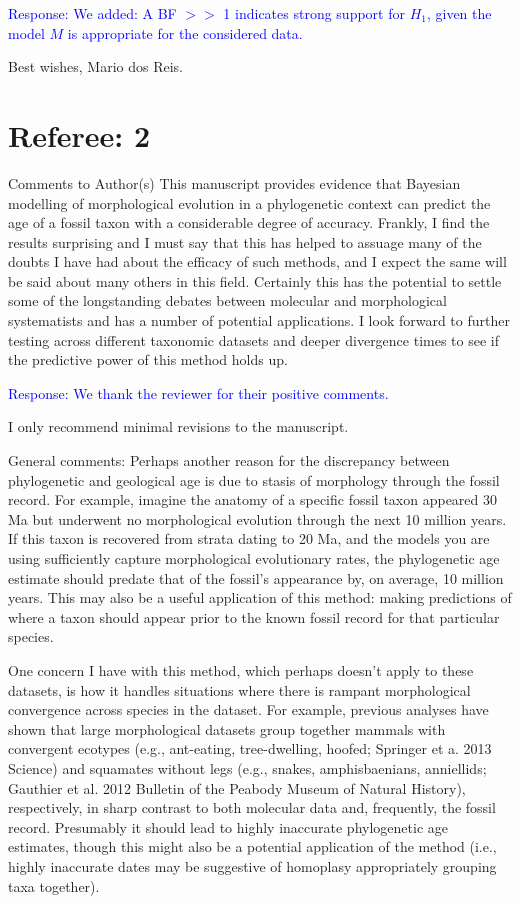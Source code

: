\documentclass[11pt]{article}
\newcommand{\response}[1]{\medskip{}\textcolor{blue}{{Response: #1}}\medskip{}}
\begin{document}
\response{We added: A BF $>>$ 1 indicates strong support for $H_1$, given the model $M$ is appropriate for the considered data.}

Best wishes,
Mario dos Reis.

\section*{Referee: 2}

Comments to Author(s)
This manuscript provides evidence that Bayesian modelling of morphological evolution in a phylogenetic context can predict the age of a fossil taxon with a considerable degree of accuracy. Frankly, I find the results surprising and I must say that this has helped to assuage many of the doubts I have had about the efficacy of such methods, and I expect the same will be said about many others in this field. Certainly this has the potential to settle some of the longstanding debates between molecular and morphological systematists and has a number of potential applications. I look forward to further testing across different taxonomic datasets and deeper divergence times to see if the predictive power of this method holds up. 

\response{We thank the reviewer for their positive comments.}

I only recommend minimal revisions to the manuscript.

General comments:
Perhaps another reason for the discrepancy between phylogenetic and geological age is due to stasis of morphology through the fossil record. For example, imagine the anatomy of a specific fossil taxon appeared 30 Ma but underwent no morphological evolution through the next 10 million years. If this taxon is recovered from strata dating to 20 Ma, and the models you are using sufficiently capture morphological evolutionary rates, the phylogenetic age estimate should predate that of the fossil's appearance by, on average, 10 million years. This may also be a useful application of this method: making predictions of where a taxon should appear prior to the known fossil record for that particular species.

One concern I have with this method, which perhaps doesn't apply to these datasets, is how it handles situations where there is rampant morphological convergence across species in the dataset. For example, previous analyses have shown that large morphological datasets group together mammals with convergent ecotypes (e.g., ant-eating, tree-dwelling, hoofed; Springer et a. 2013 Science) and squamates without legs (e.g., snakes, amphisbaenians, anniellids; Gauthier et al. 2012 Bulletin of the Peabody Museum of Natural History), respectively, in sharp contrast to both molecular data and, frequently, the fossil record. Presumably it should lead to highly inaccurate phylogenetic age estimates, though this might also be a potential application of the method (i.e., highly inaccurate dates may be suggestive of homoplasy appropriately grouping taxa together).
\end{document}
